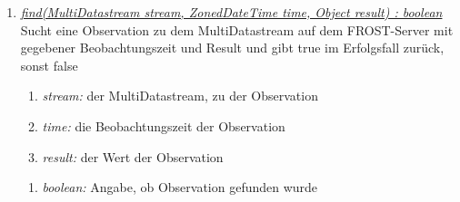 \begin{enumerate}[+]
\item \underline{\textit{find(MultiDatastream stream, ZonedDateTime time, Object result) : boolean}}\\
Sucht eine Observation zu dem MultiDatastream auf dem FROST-Server mit gegebener Beobachtungszeit und Result und gibt true im Erfolgsfall zurück, sonst false

\begin{enumerate}[$\bullet$]
\item \textit{stream:} der MultiDatastream, zu der Observation
\item \textit{time:} die Beobachtungszeit der Observation
\item \textit{result:} der Wert der Observation
\end{enumerate}
\vspace{-0.2cm}
\begin{enumerate}[$\circ$]
\item \textit{boolean:} Angabe, ob Observation gefunden wurde
\end{enumerate}

\end{enumerate}